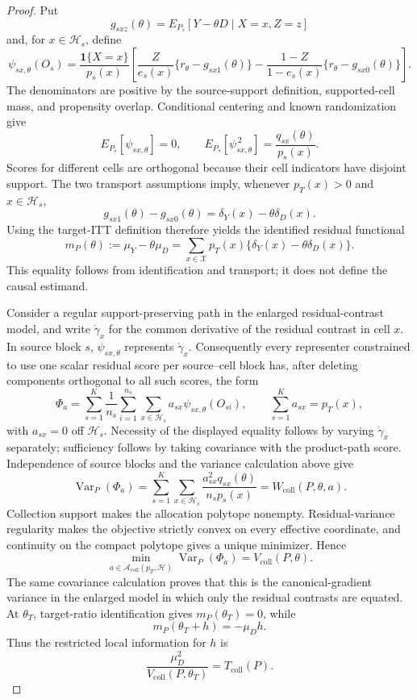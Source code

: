 \documentclass{article}
\begin{document}
\begin{proof}
Put
\[
 g_{sxz}(\theta)=E_{P_s}[Y-\theta D\mid X=x,Z=z]
\]
and, for \(x\in\mathcal H_s\), define
\[
 \psi_{sx,\theta}(O_s)
 =\frac{\mathbf 1\{X=x\}}{p_s(x)}
 \left[
 \frac{Z}{e_s(x)}\{r_\theta-g_{sx1}(\theta)\}
 -\frac{1-Z}{1-e_s(x)}\{r_\theta-g_{sx0}(\theta)\}
 \right].
\]
The denominators are positive by the source-support definition, supported-cell mass, and propensity overlap. Conditional centering and known randomization give
\[
 E_{P_s}[\psi_{sx,\theta}]=0,
 \qquad
 E_{P_s}[\psi_{sx,\theta}^{\,2}]
 =\frac{q_{sx}(\theta)}{p_s(x)}.
\]
Scores for different cells are orthogonal because their cell indicators have disjoint support. The two transport assumptions imply, whenever \(p_T(x)>0\) and \(x\in\mathcal H_s\),
\[
 g_{sx1}(\theta)-g_{sx0}(\theta)
 =\delta_Y(x)-\theta\delta_D(x).
\]
Using the target-ITT definition therefore yields the identified residual functional
\[
 m_P(\theta):=\mu_Y-\theta\mu_D
 =\sum_{x\in\mathcal X}p_T(x)
   \{\delta_Y(x)-\theta\delta_D(x)\}.
\]
This equality follows from identification and transport; it does not define the causal estimand.

Consider a regular support-preserving path in the enlarged residual-contrast model, and write \(\dot\gamma_x\) for the common derivative of the residual contrast in cell \(x\). In source block \(s\), \(\psi_{sx,\theta}\) represents \(\dot\gamma_x\). Consequently every representer constrained to use one scalar residual score per source--cell block has, after deleting components orthogonal to all such scores, the form
\[
 \Phi_a
 =\sum_{s=1}^K\frac1{n_s}\sum_{i=1}^{n_s}
   \sum_{x\in\mathcal H_s}a_{sx}\psi_{sx,\theta}(O_{si}),
 \qquad
 \sum_{s=1}^K a_{sx}=p_T(x),
\]
with \(a_{sx}=0\) off \(\mathcal H_s\). Necessity of the displayed equality follows by varying \(\dot\gamma_x\) separately; sufficiency follows by taking covariance with the product-path score. Independence of source blocks and the variance calculation above give
\[
 \operatorname{Var}_P(\Phi_a)
 =\sum_{s=1}^K\sum_{x\in\mathcal H_s}
 \frac{a_{sx}^2q_{sx}(\theta)}{n_sp_s(x)}
 =W_{\mathrm{coll}}(P,\theta,a).
\]
Collection support makes the allocation polytope nonempty. Residual-variance regularity makes the objective strictly convex on every effective coordinate, and continuity on the compact polytope gives a unique minimizer. Hence
\[
 \min_{a\in\mathcal A_{\mathrm{coll}}(p_T,\mathcal H)}
 \operatorname{Var}_P(\Phi_a)
 =V_{\mathrm{coll}}(P,\theta).
\]
The same covariance calculation proves that this is the canonical-gradient variance in the enlarged model in which only the residual contrasts are equated. At \(\theta_T\), target-ratio identification gives \(m_P(\theta_T)=0\), while
\[
 m_P(\theta_T+h)=-\mu_Dh.
\]
Thus the restricted local information for \(h\) is
\[
 \frac{\mu_D^2}{V_{\mathrm{coll}}(P,\theta_T)}
 =T_{\mathrm{coll}}(P).
\]


\end{proof}
\end{document}
